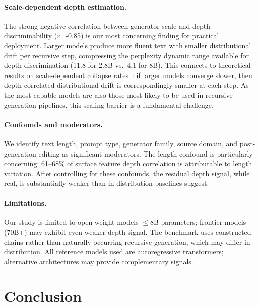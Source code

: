 \documentclass[11pt]{article}
\begin{document}
\paragraph{Scale-dependent depth estimation.}
The strong negative correlation between generator scale and depth discriminability ($r$=-0.85) is our most concerning finding for practical deployment.
Larger models produce more fluent text with smaller distributional drift per recursive step, compressing the perplexity dynamic range available for depth discrimination (11.8 for 2.8B vs.\ 4.1 for 8B).
This connects to theoretical results on scale-dependent collapse rates~\citep{gerstgrasser2024model}: if larger models converge slower, then depth-correlated distributional drift is correspondingly smaller at each step.
As the most capable models are also those most likely to be used in recursive generation pipelines, this scaling barrier is a fundamental challenge.

\paragraph{Confounds and moderators.}
We identify text length, prompt type, generator family, source domain, and post-generation editing as significant moderators.
The length confound is particularly concerning: 61--68\% of surface feature depth correlation is attributable to length variation.
After controlling for these confounds, the residual depth signal, while real, is substantially weaker than in-distribution baselines suggest.

\paragraph{Limitations.}
Our study is limited to open-weight models $\leq$8B parameters; frontier models (70B+) may exhibit even weaker depth signal.
The benchmark uses constructed chains rather than naturally occurring recursive generation, which may differ in distribution.
All reference models used are autoregressive transformers; alternative architectures may provide complementary signals.

\section{Conclusion}
\label{sec:conclusion}
\end{document}
